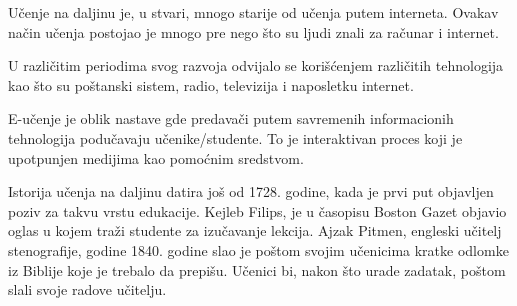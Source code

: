 \documentclass{article}
\begin{document}
Učenje na daljinu je, u stvari, mnogo starije od učenja putem interneta. Ovakav način učenja postojao je mnogo pre nego što su ljudi znali za računar i internet.

U različitim periodima svog razvoja odvijalo se korišćenjem različitih tehnologija kao što su poštanski sistem, radio, televizija i naposletku internet.

E-učenje je oblik nastave gde predavači putem savremenih informacionih tehnologija podučavaju učenike/studente. To je interaktivan proces koji je upotpunjen medijima kao pomoćnim sredstvom.

Istorija učenja na daljinu datira još od 1728. godine, kada je prvi put objavljen poziv za takvu vrstu edukacije. Kejleb Filips, je u časopisu Boston Gazet objavio oglas u kojem traži studente za izučavanje lekcija.
Ajzak Pitmen, engleski učitelj stenografije, godine 1840. godine slao je poštom svojim učenicima kratke odlomke iz Biblije koje je trebalo da prepišu. Učenici bi, nakon što urade zadatak, poštom slali svoje radove učitelju.
\end{document}
